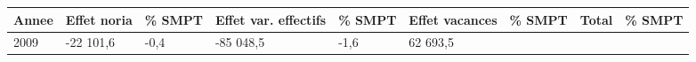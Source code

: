 \begin{longtable}[]{@{}lllllllll@{}}
\toprule
\begin{minipage}[b]{0.05\columnwidth}\raggedright
Annee\strut
\end{minipage} & \begin{minipage}[b]{0.10\columnwidth}\raggedright
Effet noria\strut
\end{minipage} & \begin{minipage}[b]{0.06\columnwidth}\raggedright
\% SMPT\strut
\end{minipage} & \begin{minipage}[b]{0.17\columnwidth}\raggedright
Effet var. effectifs\strut
\end{minipage} & \begin{minipage}[b]{0.06\columnwidth}\raggedright
\% SMPT\strut
\end{minipage} & \begin{minipage}[b]{0.12\columnwidth}\raggedright
Effet vacances\strut
\end{minipage} & \begin{minipage}[b]{0.06\columnwidth}\raggedright
\% SMPT\strut
\end{minipage} & \begin{minipage}[b]{0.08\columnwidth}\raggedright
Total\strut
\end{minipage} & \begin{minipage}[b]{0.06\columnwidth}\raggedright
\% SMPT\strut
\end{minipage}\tabularnewline
\midrule
\endhead
\begin{minipage}[t]{0.05\columnwidth}\raggedright
2009\strut
\end{minipage} & \begin{minipage}[t]{0.10\columnwidth}\raggedright
-22 101,6\strut
\end{minipage} & \begin{minipage}[t]{0.06\columnwidth}\raggedright
-0,4\strut
\end{minipage} & \begin{minipage}[t]{0.17\columnwidth}\raggedright
-85 048,5\strut
\end{minipage} & \begin{minipage}[t]{0.06\columnwidth}\raggedright
-1,6\strut
\end{minipage} & \begin{minipage}[t]{0.12\columnwidth}\raggedright
62 693,5\strut
\end{minipage} & \begin{minipage}[t]{0.06\columnwidth}\raggedright

\end{minipage}
\end{longtable}
